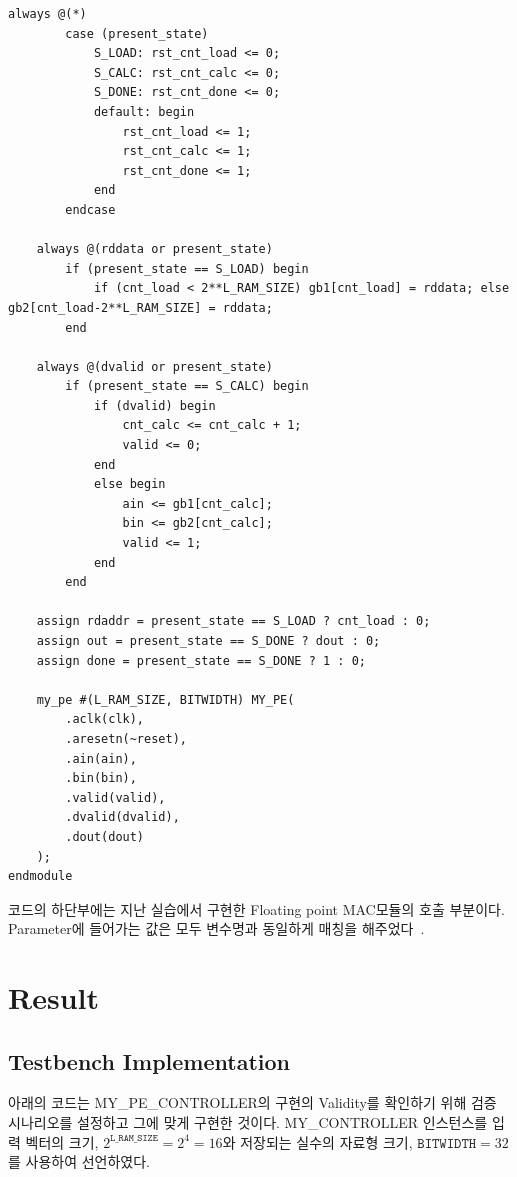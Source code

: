 \documentclass{article}
\begin{document}
\begin{lstlisting}[style={verilog-style}]
    always @(*)
        case (present_state)
            S_LOAD: rst_cnt_load <= 0;
            S_CALC: rst_cnt_calc <= 0;
            S_DONE: rst_cnt_done <= 0;
            default: begin
                rst_cnt_load <= 1; 
                rst_cnt_calc <= 1;
                rst_cnt_done <= 1;
            end
        endcase
        
    always @(rddata or present_state)
        if (present_state == S_LOAD) begin
            if (cnt_load < 2**L_RAM_SIZE) gb1[cnt_load] = rddata; else gb2[cnt_load-2**L_RAM_SIZE] = rddata;
        end
    
    always @(dvalid or present_state)
        if (present_state == S_CALC) begin
            if (dvalid) begin
                cnt_calc <= cnt_calc + 1;
                valid <= 0;
            end
            else begin
                ain <= gb1[cnt_calc];
                bin <= gb2[cnt_calc];
                valid <= 1;
            end
        end
    
    assign rdaddr = present_state == S_LOAD ? cnt_load : 0;
    assign out = present_state == S_DONE ? dout : 0;
    assign done = present_state == S_DONE ? 1 : 0;
    
    my_pe #(L_RAM_SIZE, BITWIDTH) MY_PE(
        .aclk(clk),
        .aresetn(~reset),
        .ain(ain),
        .bin(bin),
        .valid(valid),
        .dvalid(dvalid),
        .dout(dout)
    );
endmodule
\end{lstlisting}

코드의 하단부에는 지난 실습에서 구현한 Floating point MAC모듈의 호출 부분이다. Parameter에 들어가는 값은 모두 변수명과 동일하게 매칭을 해주었다~\cite{thomas2008verilog}.

\newpage
\section{Result}

\subsection{Testbench Implementation}
\label{sec:testbench}
아래의 코드는 MY\_PE\_CONTROLLER의 구현의 Validity를 확인하기 위해 검증 시나리오를 설정하고 그에 맞게 구현한 것이다. MY\_CONTROLLER 인스턴스를 입력 벡터의 크기, $2^\texttt{L\_RAM\_SIZE}= 2^4=16$와 저장되는 실수의 자료형 크기, $\texttt{BITWIDTH}=32$를 사용하여 선언하였다.
\end{document}
